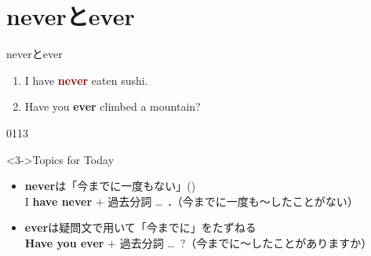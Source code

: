 \documentclass[aspectratio=169,xcolor={dvipsnames,table}]{beamer}
\newcommand{\myaudio}[1]{\href{#1}{\faVolumeUp}}
\begin{document}
\section{neverとever}
\begin{frame}[plain]{neverとever}
\large

 \begin{enumerate}
  \item<1-> I have \textcolor{Maroon}{\bfseries never} eaten sushi.\hfill{}
  \item<4-> Have you \textcolor{NavyBlue}{\bfseries ever} climbed a mountain?\hfill{}
 \end{enumerate}
\hfill{\tiny 0113}\,{\scriptsize \myaudio{./audio/013_have_pp_keiken_04.mp3}}

\vfill

\begin{block}<3->{Topics for Today}
\small
\begin{itemize}[square]\small
 \item<3-> {\bfseries never}は「今までに一度もない」()\\
I {\bfseries have never} $+$ 過去分詞 \ldots\,\,\,\textbf{.}{{\footnotesize （今までに一度も〜したことがない）}}
 \item<6-> {\bfseries ever}は疑問文で用いて「今までに」\hfill{をたずねる}\\
\textbf{Have you ever} $+$ 過去分詞 \ldots\,\,\,?{{\footnotesize （今までに〜したことがありますか）}}
\end{itemize}
\end{block}
\end{frame}
\end{document}
